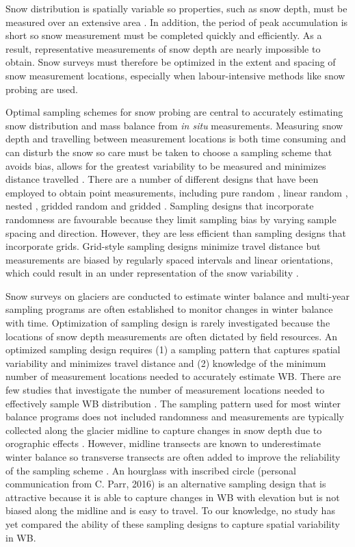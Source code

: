 \documentclass[twocolumn,letterpaper]{igs}
\begin{document}
Snow distribution is spatially variable so properties, such as snow depth, must be measured over an extensive area \citep[e.g.][]{Kinar2015}. In addition, the period of peak accumulation is short so snow measurement must be completed quickly and efficiently. As a result, representative measurements of snow depth are nearly impossible to obtain. Snow surveys must therefore be optimized in the extent and spacing of snow measurement locations, especially when labour-intensive methods like snow probing are used. 

Optimal sampling schemes for snow probing are central to accurately estimating snow distribution and mass balance from \textit{in situ} measurements. Measuring snow depth and travelling between measurement locations is both time consuming and can disturb the snow so care must be taken to choose a sampling scheme that avoids bias, allows for the greatest variability to be measured and minimizes distance travelled \citep{Shea2010}. There are a number of different designs that have been employed to obtain point measurements, including pure random \citep[e.g.][]{Elder1991}, linear random \cite[e.g.][]{Shea2010}, nested \citep[e.g.][]{Schweizer2008}, gridded random \citep[e.g.][]{Bellaire2008, Elder2009, Bellaire2011} and gridded \citep[e.g.][]{Molotch2005a, Kronholm2007, Lopez2011}. Sampling designs that incorporate randomness are favourable because they limit sampling bias by varying sample spacing and direction. However, they are less efficient than sampling designs that incorporate grids. Grid-style sampling designs minimize travel distance but measurements are biased by regularly spaced intervals and linear orientations, which could result in an under representation of the snow variability \citep{Kronholm2007}.

Snow surveys on glaciers are conducted to estimate winter balance and multi-year sampling programs are often established to monitor changes in winter balance with time. Optimization of sampling design is rarely investigated because the locations of snow depth measurements are often dictated by field resources. An optimized sampling design requires (1) a sampling pattern that captures spatial variability and minimizes travel distance and (2) knowledge of the minimum number of measurement locations needed to accurately estimate WB. There are few studies that investigate the number of measurement locations needed to effectively sample WB distribution \citep[c.f.][]{Fountain1999,Walmsley2015}. The sampling pattern used for most winter balance programs does not included randomness and measurements are typically collected along the glacier midline \citep[e.g.][]{Kaser2003} to capture changes in snow depth due to orographic effects \citep[e.g.][]{Grunewald2014}. However, midline transects are known to underestimate winter balance so transverse transects are often added to improve the reliability of the sampling scheme \citep[e.g.][]{Walmsley2015}. An hourglass with inscribed circle (personal communication from C. Parr, 2016) is an alternative sampling design that is attractive because it is able to capture changes in WB with elevation but is not biased along the midline and is easy to travel. To our knowledge, no study has yet compared the ability of these sampling designs to capture spatial variability in WB.  
\end{document}
